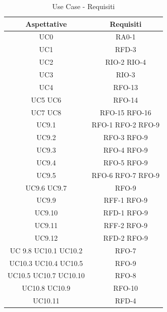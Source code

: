 \begin{table}[h]
\begin{center}
     \begin{tabular}
           {@{\extracolsep{\fill}}|c|c|}
     \hline
      \textbf{Aspettative} & \textbf{Requisiti} \\
      \hline
     UC0 & RA0-1 \\
     \hline
     UC1 & RFD-3  \\
     \hline
     UC2 & RIO-2  RIO-4\\
     \hline
     UC3 & RIO-3 \\
     \hline
     UC4 & RFO-13 \\
     \hline
     UC5 UC6 & RFO-14 \\
      \hline
     UC7 UC8 & RFO-15 RFO-16 \\
     \hline
     UC9.1 & RFO-1 RFO-2 RFO-9\\
     \hline
     UC9.2 &  RFO-3 RFO-9\\
     \hline
     UC9.3 & RFO-4 RFO-9\\
     \hline
     UC9.4 & RFO-5 RFO-9\\
     \hline
     UC9.5 & RFO-6 RFO-7 RFO-9\\
     \hline
     UC9.6 UC9.7 & RFO-9 \\
     \hline
     UC9.9 & RFF-1 RFO-9 \\
     \hline
     UC9.10 & RFD-1 RFO-9\\
     \hline
     UC9.11 & RFF-2 RFO-9 \\
     \hline 
     UC9.12 & RFD-2 RFO-9 \\
     \hline
     UC 9.8 UC10.1 UC10.2 &  RFO-7 \\
     \hline
     UC10.3 UC10.4 UC10.5 & RFO-9 \\
     \hline
     UC10.5 UC10.7 UC10.10 &  RFO-8 \\
     \hline
     UC10.8 UC10.9 & RFO-10 \\
     \hline
     UC10.11 & RFD-4 \\
     
    \hline %
    \end{tabular}
  \caption{Use Case - Requisiti} %
  \label{tab:aspettative}
  \end{center}
\end{table}
 \newpage
 
